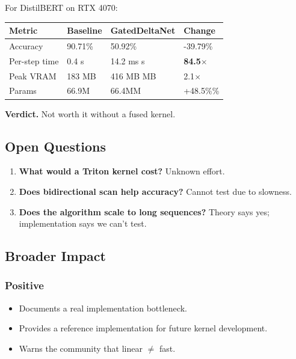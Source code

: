 For DistilBERT on RTX 4070:

\begin{table}[H]
\centering
\small
\begin{tabular}{llll}
\toprule
\textbf{Metric} & \textbf{Baseline} & \textbf{GatedDeltaNet} & \textbf{Change} \\
\midrule
Accuracy & 90.71\% & 50.92\% & -39.79\% \\
Per-step time & 0.4 s & 14.2 ms s & \textbf{84.5$\times$} \\
Peak VRAM & 183 MB & 416 MB MB & 2.1$\times$ \\
Params & 66.9M & 66.4MM & +48.5\%\% \\
\bottomrule
\end{tabular}
\end{table}

\textbf{Verdict.} Not worth it without a fused kernel.

\subsection{Open Questions}

\begin{enumerate}
\item \textbf{What would a Triton kernel cost?} Unknown effort.
\item \textbf{Does bidirectional scan help accuracy?} Cannot test due to slowness.
\item \textbf{Does the algorithm scale to long sequences?} Theory says yes;
  implementation says we can't test.

\end{enumerate}
\subsection{Broader Impact}

\subsubsection{Positive}

\begin{itemize}
\item Documents a real implementation bottleneck.
\item Provides a reference implementation for future kernel development.
\item Warns the community that linear $\ne$ fast.

\end{itemize}
